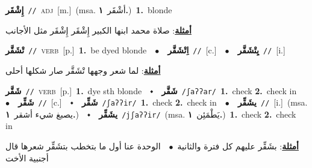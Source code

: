 \documentclass[10pt,a4paper,twoside]{article} %
\begin{document}
\begin{multicols}{2}
{\setlength\topsep{0pt}\textbf{\foreignlanguage{arabic}{إِشْقَر}}\ {\color{gray}\texttt{//}\color{black}}\ \textsc{adj}\ [m.]\ \color{gray}(msa. \foreignlanguage{arabic}{أشْقَر}~\foreignlanguage{arabic}{\textbf{١.}})\color{black}\ \textbf{1.}~blonde\  \begin{flushright}\color{gray}\foreignlanguage{arabic}{\textbf{\underline{\foreignlanguage{arabic}{أمثلة}}}: صلاة محمد ابنها الكبير إِشْقَر إِشْقَر مثل الأجانب}\end{flushright}\color{black}} \vspace{2mm}

{\setlength\topsep{0pt}\textbf{\foreignlanguage{arabic}{تْشَقَّر}}\ {\color{gray}\texttt{//}\color{black}}\ \textsc{verb}\ [p.]\ \textbf{1.}~be dyed blonde\ \ $\bullet$\ \ \setlength\topsep{0pt}\textbf{\foreignlanguage{arabic}{اِتْشَقَّر}}\ {\color{gray}\texttt{//}\color{black}}\ [c.]\ \ $\bullet$\ \ \setlength\topsep{0pt}\textbf{\foreignlanguage{arabic}{يِتْشَقَّر}}\ {\color{gray}\texttt{//}\color{black}}\ [i.]\  \begin{flushright}\color{gray}\foreignlanguage{arabic}{\textbf{\underline{\foreignlanguage{arabic}{أمثلة}}}: لما شعر وجهها تْشَقَّر صار شكلها أحلى}\end{flushright}\color{black}} \vspace{2mm}

{\setlength\topsep{0pt}\textbf{\foreignlanguage{arabic}{شَقَّر}}\ {\color{gray}\texttt{//}\color{black}}\ \textsc{verb}\ [p.]\ \textbf{1.}~dye sth blonde\ \ $\smblkdiamond$\ \ \setlength\topsep{0pt}\textbf{\foreignlanguage{arabic}{شَقَّر}}\ {\color{gray}\texttt{/ʃaʔʔar/}\color{black}}\ \textbf{1.}~check  \textbf{2.}~check in\ \ $\bullet$\ \ \setlength\topsep{0pt}\textbf{\foreignlanguage{arabic}{شَقِّر}}\ {\color{gray}\texttt{//}\color{black}}\ [c.]\ \ $\smblkdiamond$\ \ \setlength\topsep{0pt}\textbf{\foreignlanguage{arabic}{شَقِّر}}\ {\color{gray}\texttt{/ʃaʔʔir/}\color{black}}\ \textbf{1.}~check  \textbf{2.}~check in\ \ $\bullet$\ \ \setlength\topsep{0pt}\textbf{\foreignlanguage{arabic}{يشَقِّر}}\ {\color{gray}\texttt{//}\color{black}}\ [i.]\ \color{gray}(msa. \foreignlanguage{arabic}{يصبغ شيء أشقر}~\foreignlanguage{arabic}{\textbf{١.}})\color{black}\ \ $\smblkdiamond$\ \ \setlength\topsep{0pt}\textbf{\foreignlanguage{arabic}{يشَقِّر}}\ {\color{gray}\texttt{/jʃaʔʔir/}\color{black}}\ \color{gray}(msa. \foreignlanguage{arabic}{يَطْمَئِن}~\foreignlanguage{arabic}{\textbf{١.}})\color{black}\ \textbf{1.}~check  \textbf{2.}~check in\  \begin{flushright}\color{gray}\foreignlanguage{arabic}{\textbf{\underline{\foreignlanguage{arabic}{أمثلة}}}: بشَقِّر عليهم كل فترة والثانية\ $\bullet$\ \  الوحدة عنا أول ما بتخطب بتشَقِّر شعرها قال أجنبية الأخت}\end{flushright}\color{black}} \vspace{2mm}


\end{multicols}
\end{document}
